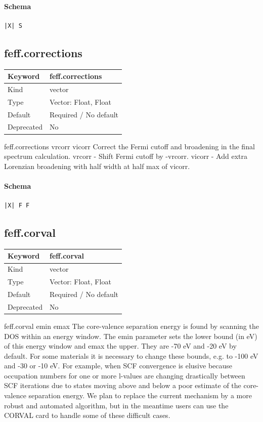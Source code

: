 \documentclass[11pt]{article}
\begin{document}
{{{\paragraph{Schema}
\begin{Verbatim}
|X| S
\end{Verbatim}

\subsection{feff.corrections}
\label{kw:feff-corrections}
\begin{longtable}{|p{1.5in}|p{4.5in}|}
\hline
Keyword & feff.corrections \\
\hline
Kind & vector \\
\hline
Type & Vector: Float, Float \\
\hline
Default & Required / No default \\
\hline
Deprecated & No \\
\hline
\end{longtable}
 feff.corrections{ vrcorr vicorr }
 Correct the Fermi cutoff and broadening in the final spectrum calculation.
 vrcorr - Shift Fermi cutoff by -vrcorr.
 vicorr - Add extra Lorenzian broadening with half width at half max of vicorr.

\paragraph{Schema}
\begin{Verbatim}
|X| F F
\end{Verbatim}

\subsection{feff.corval}
\label{kw:feff-corval}
\begin{longtable}{|p{1.5in}|p{4.5in}|}
\hline
Keyword & feff.corval \\
\hline
Kind & vector \\
\hline
Type & Vector: Float, Float \\
\hline
Default & Required / No default \\
\hline
Deprecated & No \\
\hline
\end{longtable}
 feff.corval{ emin emax }
 The core-valence separation energy is found by scanning the DOS within an energy window.
 The emin parameter sets the lower bound (in eV) of this energy window and emax the upper.
 They are -70 eV and -20 eV by
 default. For some materials it is necessary to change these bounds, e.g. to -100 eV and
 -30 or -10 eV. For example,
 when SCF convergence is elusive because occupation numbers for one or more l-values are
 changing drastically between SCF iterations due to states moving above and below a poor
 estimate of the core-valence separation energy. We plan to replace the current mechanism by a
 more robust and automated algorithm, but in the meantime users can use the CORVAL card
 to handle some of these difficult cases.

}}}
\end{document}
